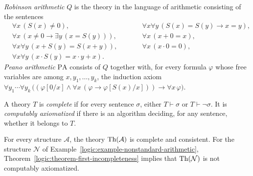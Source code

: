 \begin{definition}\label{logic:definition-arithmetic}
\emph{Robinson arithmetic} $Q$ is the theory in the language of arithmetic
consisting of the sentences
\[
\begin{aligned}
& \forall x\, (S(x) \neq 0), \qquad && \forall x \forall y\, (S(x) = S(y) \to x = y), \\
& \forall x\, (x \neq 0 \to \exists y\, (x = S(y))), \qquad && \forall x\, (x + 0 = x), \\
& \forall x \forall y\, (x + S(y) = S(x + y)), \qquad && \forall x\, (x \cdot 0 = 0), \\
& \forall x \forall y\, (x \cdot S(y) = x \cdot y + x).
\end{aligned}
\]
\emph{Peano arithmetic} $\mathrm{PA}$ consists of $Q$ together with, for every
formula $\varphi$ whose free variables are among $x, y_1, \ldots, y_k$, the
induction axiom
$\forall y_1 \cdots \forall y_k\, \bigl((\varphi[0/x] \wedge \forall x\,(\varphi \to \varphi[S(x)/x])) \to \forall x\,\varphi\bigr)$.
\end{definition}

\begin{definition}\label{logic:definition-complete-theory}
A theory $T$ is \emph{complete} if for every sentence $\sigma$, either
$T \vdash \sigma$ or $T \vdash \neg\sigma$. It is \emph{computably axiomatized}
if there is an algorithm deciding, for any sentence, whether it belongs to
$T$.
\end{definition}

\begin{example}\label{logic:example-complete-theory}
For every structure $\mathcal{A}$, the theory $\operatorname{Th}(\mathcal{A})$ is complete
and consistent. For the structure $\mathcal{N}$ of
Example~\ref{logic:example-nonstandard-arithmetic},
Theorem~\ref{logic:theorem-first-incompleteness} implies that
$\operatorname{Th}(\mathcal{N})$ is not computably axiomatized.
\end{example}

